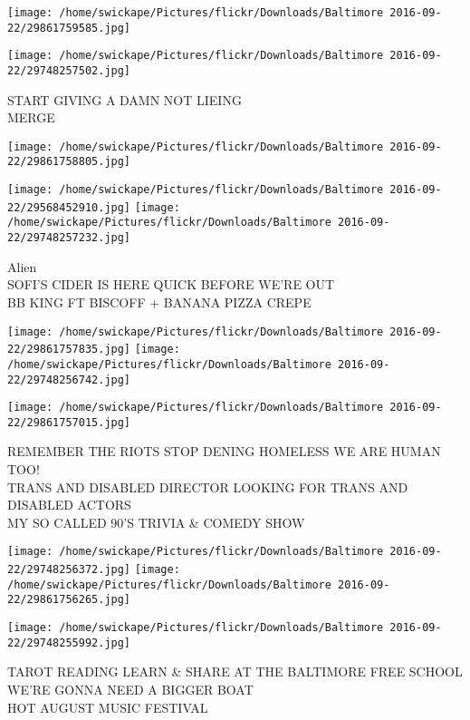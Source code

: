 \documentclass[10pt,letterpaper]{article}
\begin{document}
\texttt{[image: /home/swickape/Pictures/flickr/Downloads/Baltimore 2016-09-22/29861759585.jpg]}

\vspace{0.25in}
\texttt{[image: /home/swickape/Pictures/flickr/Downloads/Baltimore 2016-09-22/29748257502.jpg]}

START GIVING A DAMN NOT LIEING\\
MERGE\\
\pagebreak

\texttt{[image: /home/swickape/Pictures/flickr/Downloads/Baltimore 2016-09-22/29861758805.jpg]}

\vspace{0.25in}
\texttt{[image: /home/swickape/Pictures/flickr/Downloads/Baltimore 2016-09-22/29568452910.jpg]}
\texttt{[image: /home/swickape/Pictures/flickr/Downloads/Baltimore 2016-09-22/29748257232.jpg]}

Alien\\
SOFI'S CIDER IS HERE QUICK BEFORE WE'RE OUT\\
BB KING FT BISCOFF + BANANA PIZZA CREPE\\
\pagebreak

\texttt{[image: /home/swickape/Pictures/flickr/Downloads/Baltimore 2016-09-22/29861757835.jpg]}
\texttt{[image: /home/swickape/Pictures/flickr/Downloads/Baltimore 2016-09-22/29748256742.jpg]}

\vspace{0.25in}
\texttt{[image: /home/swickape/Pictures/flickr/Downloads/Baltimore 2016-09-22/29861757015.jpg]}

REMEMBER THE RIOTS STOP DENING HOMELESS WE ARE HUMAN TOO!\\
TRANS AND DISABLED DIRECTOR LOOKING FOR TRANS AND DISABLED ACTORS\\
MY SO CALLED 90'S TRIVIA \& COMEDY SHOW\\
\pagebreak

\texttt{[image: /home/swickape/Pictures/flickr/Downloads/Baltimore 2016-09-22/29748256372.jpg]}
\texttt{[image: /home/swickape/Pictures/flickr/Downloads/Baltimore 2016-09-22/29861756265.jpg]}

\texttt{[image: /home/swickape/Pictures/flickr/Downloads/Baltimore 2016-09-22/29748255992.jpg]}

TAROT READING LEARN \& SHARE AT THE BALTIMORE FREE SCHOOL\\
WE'RE GONNA NEED A BIGGER BOAT\\
HOT AUGUST MUSIC FESTIVAL\\
\pagebreak
\end{document}
